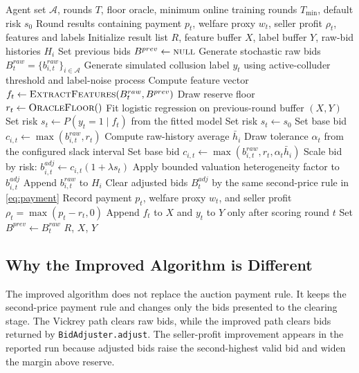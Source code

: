 \documentclass[conference]{IEEEtran}
\begin{document}
\begin{algorithm}[t]
\caption{Improved collusion-aware auction with online risk and bid adjustment}
\label{alg:improved}
\begin{algorithmic}[1]
\REQUIRE Agent set $\mathcal{A}$, rounds $T$, floor oracle, minimum online training rounds $T_{\min}$, default risk $s_0$
\ENSURE Round results containing payment $p_t$, welfare proxy $w_t$, seller profit $\rho_t$, features and labels
\STATE Initialize result list $R$, feature buffer $X$, label buffer $Y$, raw-bid histories $H_i$
\STATE Set previous bids $B^{prev} \leftarrow \textsc{null}$
    \STATE Generate stochastic raw bids $B^{raw}_t=\{b^{raw}_{i,t}\}_{i \in \mathcal{A}}$
    \STATE Generate simulated collusion label $y_t$ using active-colluder threshold and label-noise process
    \STATE Compute feature vector $f_t \leftarrow \textsc{ExtractFeatures}(B^{raw}_t,B^{prev})$
    \STATE Draw reserve floor $r_t \leftarrow \textsc{OracleFloor}()$
        \STATE Fit logistic regression on previous-round buffer $(X,Y)$
        \STATE Set risk $s_t \leftarrow P(y_t=1 \mid f_t)$ from the fitted model
    \ELSE
        \STATE Set risk $s_t \leftarrow s_0$
    \ENDIF
            \STATE Set base bid $c_{i,t} \leftarrow \max(b^{raw}_{i,t},r_t)$
        \ELSE
            \STATE Compute raw-history average $\bar{h}_i$
            \STATE Draw tolerance $\alpha_t$ from the configured slack interval
            \STATE Set base bid $c_{i,t} \leftarrow \max(b^{raw}_{i,t},r_t,\alpha_t\bar{h}_i)$
        \ENDIF
        \STATE Scale bid by risk: $b^{adj}_{i,t} \leftarrow c_{i,t}(1+\lambda s_t)$
        \STATE Apply bounded valuation heterogeneity factor to $b^{adj}_{i,t}$
        \STATE Append $b^{raw}_{i,t}$ to $H_i$
    \ENDFOR
    \STATE Clear adjusted bids $B^{adj}_t$ by the same second-price rule in \eqref{eq:payment}
        \STATE Record payment $p_t$, welfare proxy $w_t$, and seller profit $\rho_t=\max(p_t-r_t,0)$
    \ENDIF
    \STATE Append $f_t$ to $X$ and $y_t$ to $Y$ only after scoring round $t$
    \STATE Set $B^{prev} \leftarrow B^{raw}_t$
\ENDFOR
\RETURN $R$, $X$, $Y$
\end{algorithmic}
\end{algorithm}

\subsection{Why the Improved Algorithm is Different}
The improved algorithm does not replace the auction payment rule. It keeps the second-price payment rule and changes only the bids presented to the clearing stage. The Vickrey path clears raw bids, while the improved path clears bids returned by \texttt{BidAdjuster.adjust}. The seller-profit improvement appears in the reported run because adjusted bids raise the second-highest valid bid and widen the margin above reserve.
\end{document}
